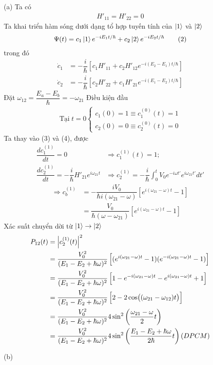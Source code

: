 \documentclass{article}
\newcommand{\f}[2]{\dfrac{#1}{#2}}
\begin{document}
\begin{enumerate}
	\item[(a)] Ta có 
	\begin{align*}
		H'_{11} = H'_{22} = 0 \tag{1}
	\end{align*}
	Ta khai triển hàm sóng dưới dạng tổ hợp tuyến tính của $\ket{1}$ và $\ket{2}$
	\begin{align*}
		\Psi(t) = c_{1} \ket{1} e^{-iE_{1} t / \hbar} + c_{2} \ket{2} e^{-iE_{2} t / \hbar} \tag{2}
	\end{align*}
	trong đó
	\begin{align*}
		\dot{c}_{1} &= -\f{i}{\hbar} \left[ c_{1} H'_{11} + c_{2} H'_{12} e^{-i(E_2 - E_1) t / \hbar} \right] \tag{3}\\
		\dot{c}_{2} &= -\f{i}{\hbar} \left[ c_{2} H'_{22} + c_{1} H'_{21} e^{-i(E_1 - E_2) t / \hbar} \right] \tag{4}
	\end{align*}
	Đặt $\omega_{12} = \f{E_{a} - E_{b}}{\hbar} = - \omega_{21}$
	Điều kiện đầu
	\begin{align*}
		\text{Tại} \; t = 0
		\begin{cases}
			c_{1}(0) = 1 \equiv c_{1}^{(0)}(t) = 1 \\
			c_{2}(0) = 0 \equiv c_{2}^{(0)}(t) = 0 
		\end{cases} \tag{5}
	\end{align*}
	Ta thay vào (3) và (4), được
	\begin{align*}
		\f{d c_{1}^{(1)}}{dt} = 0 &\Rightarrow c_{1}^{(1)}(t) = 1; \\
		\f{d c_{2}^{(1)}}{dt} = -\f{i}{\hbar}H'_{21} e^{i\omega_{21} t} &\Rightarrow c_{2}^{(1)} = - \f{i}{\hbar} \int_{0}^{t} V_{0}e^{-i\omega t'} e^{i\omega_{21} t'} dt' 
	\end{align*}
	\begin{align*}
		\Rightarrow c_{b}^{(1)} 
		&= -\f{i V_{0}}{\hbar i (\omega_{21} - \omega)} \left[e^{i(\omega_{21} - \omega) t} - 1\right]\\
		&= \f{V_{0}}{\hbar (\omega - \omega_{21})} \left[e^{i(\omega_{21} - \omega) t} - 1\right] \tag{6}
	\end{align*}
	Xác suất chuyển dời từ $\ket{1} \rightarrow \ket{2}$
	\begin{align*}
		P_{12}(t) 
		&= \abs{c_{2}^{(1)}(t)}^2\\
		&= \f{V_{0}^2}{(E_{1} - E_{2} + \hbar \omega)^2} \left[(e^{i(\omega_{21} - \omega) t} - 1)(e^{-i(\omega_{21} - \omega) t} - 1)\right]\\
		&= \f{V_{0}^2}{(E_{1} - E_{2} + \hbar \omega)^2} \left[1 - e^{-i(\omega_{21} - \omega) t} -e^{i(\omega_{21} - \omega) t} + 1 \right] \\
		&= \f{V_{0}^2}{(E_{1} - E_{2} + \hbar \omega)^2} \left[2 - 2\cos((\omega_{21} - \omega_{12})t)\right] \\
		&= \f{V_{0}^2}{(E_{1} - E_{2} + \hbar \omega)^2} 4 \sin^2\left( \f{\omega_{21} - \omega}{2}t \right) \\
		&= \f{V_{0}^2}{(E_{1} - E_{2} + \hbar \omega)^2} 4 \sin^2\left( \f{E_{1} - E_{2} + \hbar\omega}{2\hbar}t \right) (DPCM)
	\end{align*}
	\item [(b)]

\end{enumerate}
 	
	
\end{document}
